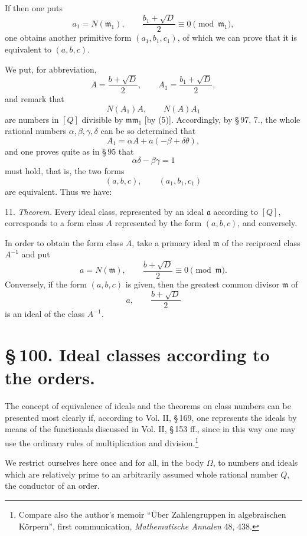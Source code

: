 \documentclass[11pt]{article}
\begin{document}
If then one puts
\begin{equation}
 a_1=N(\mathfrak m_1),\qquad
 \frac{b_1+\sqrt D}{2}\equiv0\pmod{\mathfrak m_1},
\tag{5}
\end{equation}
one obtains another primitive form $(a_1,b_1,c_1)$, of which we can prove that it is equivalent to $(a,b,c)$.

We put, for abbreviation,
\[
 A=\frac{b+\sqrt D}{2},\qquad
 A_1=\frac{b_1+\sqrt D}{2},
\]
and remark that
\[
 N(A_1)A,\qquad N(A)A_1
\]
are numbers in $[Q]$ divisible by $\mathfrak m\mathfrak m_1$ [by (5)]. Accordingly, by \S\,97, 7., the whole rational numbers $\alpha,\beta,\gamma,\delta$ can be so determined that
\begin{equation}
 A_1=\alpha A+a(-\beta+\delta\theta),
\tag{6}
\end{equation}
and one proves quite as in \S\,95 that
\[
 \alpha\delta-\beta\gamma=1
\]
must hold, that is, the two forms
\[
 (a,b,c),\qquad (a_1,b_1,c_1)
\]
are equivalent. Thus we have:

11. \emph{Theorem.} Every ideal class, represented by an ideal $\mathfrak a$ according to $[Q]$, corresponds to a form class $A$ represented by the form $(a,b,c)$, and conversely.

In order to obtain the form class $A$, take a primary ideal $\mathfrak m$ of the reciprocal class $A^{-1}$ and put
\[
 a=N(\mathfrak m),\qquad
 \frac{b+\sqrt D}{2}\equiv0\pmod{\mathfrak m}.
\]
Conversely, if the form $(a,b,c)$ is given, then the greatest common divisor $\mathfrak m$ of
\[
 a,\qquad \frac{b+\sqrt D}{2}
\]
is an ideal of the class $A^{-1}$.

\section*{\S\,100. Ideal classes according to the orders.}

The concept of equivalence of ideals and the theorems on class numbers can be presented most clearly if, according to Vol. II, \S\,169, one represents the ideals by means of the functionals discussed in Vol. II, \S\,153 ff., since in this way one may use the ordinary rules of multiplication and division.\footnote{Compare also the author's memoir ``Über Zahlengruppen in algebraischen Körpern'', first communication, \emph{Mathematische Annalen} 48, 438.}

We restrict ourselves here once and for all, in the body \(\Omega\), to numbers and ideals which are relatively prime to an arbitrarily assumed whole rational number \(Q\), the conductor of an order.
\end{document}
